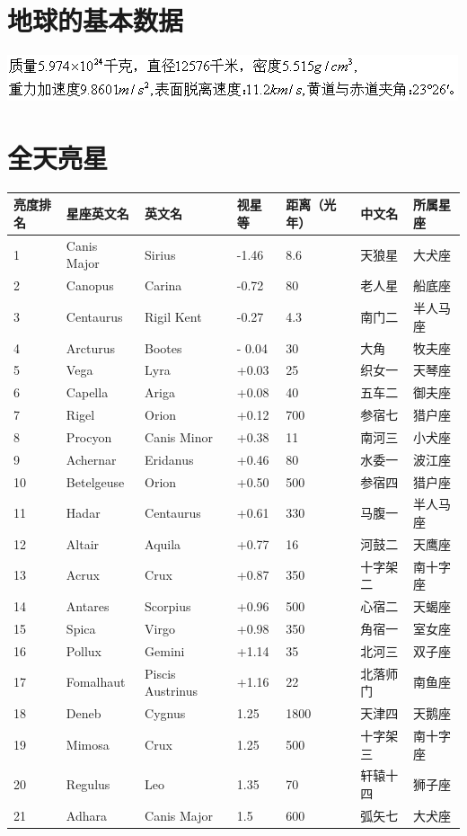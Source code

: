 \section{地球的基本数据}
\includegraphics{const_earth.png}
\section{全天亮星}
\begin{center}
	\begin{tabular}{|l|l|l|l|l|l|l|}
		\hline
		亮度排名 & 星座英文名 & 英文名 & 视星等 & 距离（光年） & 中文名 & 所属星座 \\ \hline
		1 & Canis Major & Sirius & -1.46 & 8.6 & 天狼星 & 大犬座 \\ \hline
		2   & Canopus & Carina & -0.72  & 80 & 老人星 & 船底座 \\ \hline
		3 & Centaurus & Rigil Kent  & -0.27 & 4.3 & 南门二 & 半人马座 \\ \hline
		4 & Arcturus & Bootes & - 0.04 & 30 & 大角 & 牧夫座 \\ \hline
		5 & Vega & Lyra & +0.03 & 25 & 织女一 & 天琴座 \\ \hline
		6 & Capella & Ariga & +0.08 & 40 & 五车二 & 御夫座 \\ \hline
		7 & Rigel & Orion & +0.12 & 700 & 参宿七 & 猎户座 \\ \hline
		8 & Procyon & Canis Minor & +0.38 & 11 & 南河三 & 小犬座 \\ \hline
		9 & Achernar & Eridanus & +0.46 & 80 & 水委一 & 波江座 \\ \hline
		10 & Betelgeuse & Orion & +0.50 & 500 & 参宿四 & 猎户座 \\ \hline
		11 & Hadar & Centaurus & +0.61 & 330 & 马腹一 & 半人马座 \\ \hline
		12 & Altair & Aquila & +0.77 & 16 & 河鼓二 & 天鹰座 \\ \hline
		13 & Acrux & Crux & +0.87 & 350 & 十字架二 & 南十字座 \\ \hline
		14 & Antares & Scorpius & +0.96 & 500 & 心宿二 & 天蝎座 \\ \hline
		15 & Spica & Virgo & +0.98 & 350 & 角宿一 & 室女座 \\ \hline
		16 & Pollux & Gemini & +1.14 & 35 & 北河三 & 双子座 \\ \hline
		17 & Fomalhaut & Piscis Austrinus & +1.16 & 22 & 北落师门 & 南鱼座 \\ \hline
		18 & Deneb & Cygnus & 1.25 & 1800 & 天津四 &天鹅座\\ \hline
		19 & Mimosa & Crux & 1.25 & 500 & 十字架三 &南十字座\\ \hline
		20 & Regulus & Leo & 1.35 & 70 & 轩辕十四 &狮子座\\ \hline
		21 & Adhara & Canis Major & 1.5 & 600 & 弧矢七 &大犬座\\ \hline
	\end{tabular}
\end{center}
